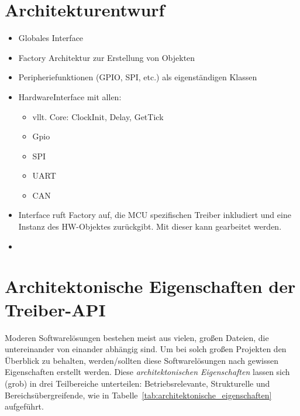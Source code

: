 \section{Architekturentwurf}
\begin{itemize}
	\item Globales Interface
	\item Factory Architektur zur Erstellung von Objekten
	\item Peripheriefunktionen (GPIO, SPI, etc.) als eigenständigen Klassen
	\item HardwareInterface mit allen:
	\begin{itemize}
		\item vllt. Core: ClockInit, Delay, GetTick
		\item Gpio
		\item SPI
		\item UART
		\item CAN
	\end{itemize}
	\item Interface ruft Factory auf, die MCU spezifischen Treiber inkludiert und eine Instanz des HW-Objektes zurückgibt. Mit dieser kann gearbeitet werden.
	\item 
\end{itemize}






\section{Architektonische Eigenschaften der Treiber-API}
Moderen Softwarelösungen bestehen meist aus vielen, großen Dateien, die untereinander von einander abhängig sind.
Um bei solch großen Projekten den Überblick zu behalten, werden/sollten diese Softwarelösungen nach gewissen Eigenschaften erstellt werden.
Diese \emph{architektonischen Eigenschaften} lassen sich (grob) in drei Teilbereiche unterteilen: Betriebsrelevante, Strukturelle und Bereichsübergreifende, wie in Tabelle~\ref{tab:architektonische_eigenschaften} aufgeführt. %

